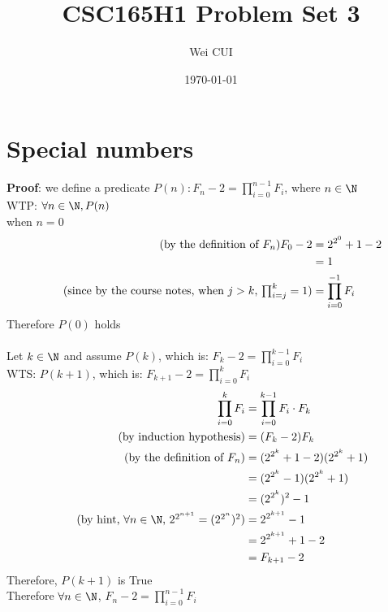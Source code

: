 \documentclass[12pt]{article}
\title{CSC165H1
Problem Set 3}
\author{Wei CUI}
\date{\today}
\begin{document}
\maketitle
\section{Special numbers}
\textbf{Proof}: we define a predicate $P(n):F_n - 2 = \prod_{i = 0}^{n - 1}F_i$, where $n \in \N$\\
WTP: $\forall n \in \N, P(n)$\\
\base\quad when $n = 0$
\begin{align*}
    \tag{by the definition of $F_n$}
    F_0 - 2 &= 2^{2^{0}} + 1 - 2\\
    &= 1\\
    \tag{since by the course notes, when $j > k$, $\prod_{i=j}^{k} = 1$}
    &= \prod_{i = 0}^{-1}F_i
\end{align*}
Therefore $P(0)$ holds\\
\\
\istep\quad Let $k \in \N$ and assume $P(k)$, which is: $F_k - 2 = \prod_{i = 0}^{k - 1}F_i$\\
WTS: $P(k+1)$, which is: $F_{k+1} - 2 = \prod_{i = 0}^{k}F_i$
\begin{align*}
    \prod_{i = 0}^{k}F_i &= \prod_{i = 0}^{k - 1} F_i \cdot F_k\\
    \tag{by induction hypothesis}
    &= (F_k - 2)F_k\\
    \tag{by the definition of $F_n$}
    &= (2^{2^{k}} + 1 - 2)(2^{2^{k}} + 1)\\
    &= (2^{2^{k}} - 1)(2^{2^{k}} + 1)\\
    &= (2^{2^{k}})^{2} - 1\\
    \tag{by hint, $\forall n \in \N$, $2^{2^{n + 1}} = (2^{2^{n}})^{2}$}
    &= 2^{2^{k + 1}} - 1\\
    &= 2^{2^{k + 1}} + 1 - 2\\
    &= F_{k+1} - 2
\end{align*}
Therefore, $P(k+1)$ is True\\
Therefore $\forall n \in \N$, $F_n - 2 = \prod_{i = 0}^{n - 1}F_i$
\newpage
\end{document}

